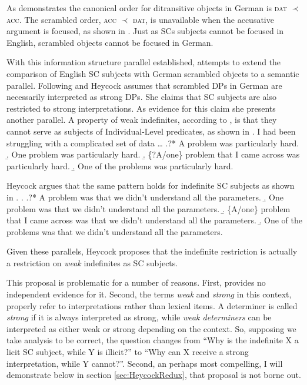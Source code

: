 \documentclass[GPFinal]{subfiles}
\begin{document}
As \Last demonstrates the canonical order for ditransitive objects in German is \textsc{dat} $\prec$ \textsc{acc}.
The scrambled order, \textsc{acc} $\prec$ \textsc{dat}, is unavailable when the accusative argument is focused, as shown in \Last[b-ii]. 
Just as SCs subjects cannot be focused in English, scrambled objects cannot be focused in German.

With this information structure parallel established, \textcite{heycock2012specification} attempts to extend the comparison of English SC subjects with German scrambled objects to a semantic parallel.
Following \textcite{dehoop1992case} and \textcite{diesing1992indefinites} Heycock assumes that scrambled DPs in German are necessarily interpreted as strong DPs.
She claims that SC subjects are also restricted to strong interpretations.
As evidence for this claim she presents another parallel.
A property of weak indefinites, according to \textcite{milsark1974existential}, is that they cannot serve as subjects of Individual-Level predicates, as shown in \Next
\ex. I had been struggling with a complicated set of data \ldots
\a.?* A problem was particularly hard.
\b. One problem was particularly hard.
\b. \{?A/one\} problem that I came across was particularly hard.
\b. One of the problems was particularly hard.\hfill\parencite{heycock2012specification}

Heycock argues that the same pattern holds for indefinite SC subjects as shown in \Next.
\ex.
\a.?* A problem was that we didn't understand all the parameters.
\b. One problem was that we didn't understand all the parameters.
\b. \{A/one\} problem that I came across was that we didn't understand all the parameters.
\b. One of the problems was that we didn't understand all the parameters.\hfill\parencite{heycock2012specification}

Given these parallels, Heycock proposes that the indefinite restriction is actually a restriction on \textit{weak} indefinites as SC subjects.

This proposal is problematic for a number of reasons.
First, \textcite{heycock2012specification} provides no independent evidence for it.
Second, the terms \textit{weak} and \textit{strong} in this context, properly refer to interpretations rather than lexical items.
A determiner is called \textit{strong} if it is always interpreted as strong, while \textit{weak determiners} can be interpreted as either weak or strong depending on the context.
So, supposing we take  analysis to be correct, the question changes from ``Why is the indefinite X a licit SC subject, while Y is illicit?'' to ``Why can X receive a strong interpretation, while Y cannot?''.
Second, an perhaps most compelling, I will demonstrate below in section \ref{sec:HeycockRedux}, that  proposal is not borne out.
\end{document}
